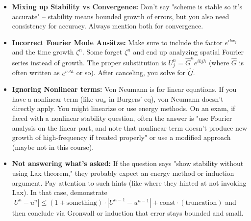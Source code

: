 \documentclass[a4paper,11pt]{article}
\begin{document}
\begin{itemize}
    \item \textbf{Mixing up Stability vs Convergence:} Don't say "scheme is stable so it's accurate" -- stability means bounded growth of errors, but you also need consistency for accuracy. Always mention both for convergence.

    \item \textbf{Incorrect Fourier Mode Ans\"atze:} Make sure to include the factor $e^{ikx_j}$ and the time growth $\zeta^n$. Some forget $\zeta^n$ and end up analyzing spatial Fourier series instead of growth. The proper substitution is $U_j^n = \hat{G}^n e^{i k j h}$ (where $\hat{G}$ is often written as $e^{\sigma \Delta t}$ or so). After canceling, you solve for $\hat{G}$.

    \item \textbf{Ignoring Nonlinear terms:} Von Neumann is for linear equations. If you have a nonlinear term (like $u u_x$ in Burgers' eq), von Neumann doesn't directly apply. You might linearize or use energy methods. On an exam, if faced with a nonlinear stability question, often the answer is "use Fourier analysis on the linear part, and note that nonlinear term doesn't produce new growth of high-frequency if treated properly" or use a modified approach (maybe not in this course).

    \item \textbf{Not answering what's asked:} If the question says "show stability without using Lax theorem," they probably expect an energy method or induction argument. Pay attention to such hints (like where they hinted at not invoking Lax). In that case, demonstrate $|U^n - u^n| \le (1+ \text{something})\cdot|U^{n-1}-u^{n-1}| + \text{const}\cdot(\text{truncation})$ and then conclude via Gronwall or induction that error stays bounded and small.
\end{itemize}

\printbibliography
\end{document}
